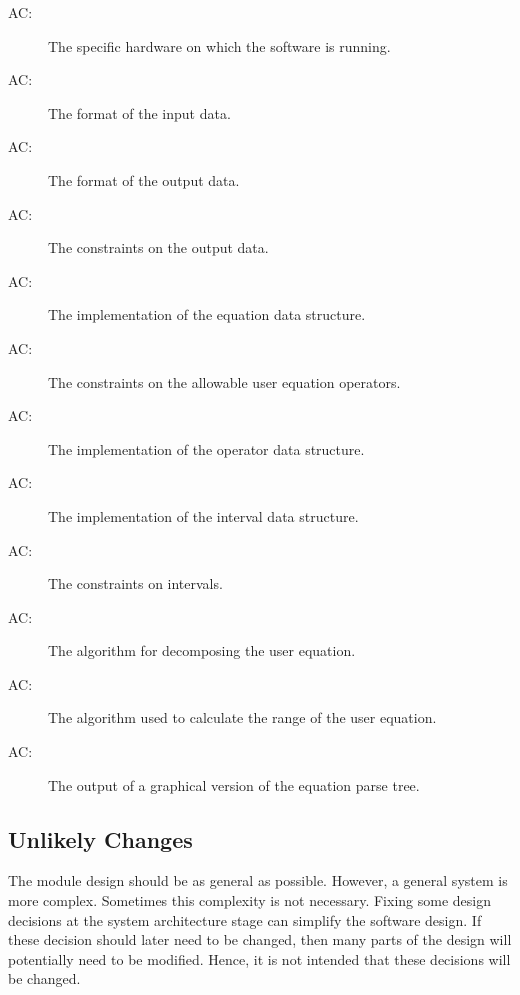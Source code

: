 \documentclass[12pt, titlepage]{article}
\newcounter{acnum}
\newcommand{\actheacnum}{AC\theacnum}
\begin{document}
\begin{description}
\item[ \actheacnum \label{acHardware}:] The specific
  hardware on which the software is running.
  
\item[ \actheacnum \label{acInput}:] The format of 
the input data.

\item[ \actheacnum \label{acOutput}:] The format of 
the output data.

\item[ \actheacnum \label{acOutputConstraints}:] The 
constraints on the output data.

\item[ \actheacnum \label{acEquationStruct}:] The 
implementation of the equation data structure.

\item[ \actheacnum \label{acEquationConstraints}:] The 
constraints on the allowable user equation operators.

\item[ \actheacnum \label{acOperatorStruct}:] The 
implementation of the operator data structure.

\item[ \actheacnum \label{acIntervalStruct}:] The 
implementation of the interval data structure.

\item[ \actheacnum \label{acIntervalConstraints}:] The 
constraints on intervals.

\item[ \actheacnum \label{acParsing}:] The algorithm for 
decomposing the user equation.

\item[ \actheacnum \label{acCalculationAlgorithm}:] The 
algorithm used to calculate the range of the user equation.

\item[ \actheacnum \label{acViewParse}:] The output of a 
graphical version of the equation parse tree.

\end{description}

\subsection{Unlikely Changes} 
\label{SecUchange}
The module design should be as general as possible. However, a general system is
more complex. Sometimes this complexity is not necessary. Fixing some design
decisions at the system architecture stage can simplify the software design. If
these decision should later need to be changed, then many parts of the design
will potentially need to be modified. Hence, it is not intended that these
decisions will be changed.
\end{document}

